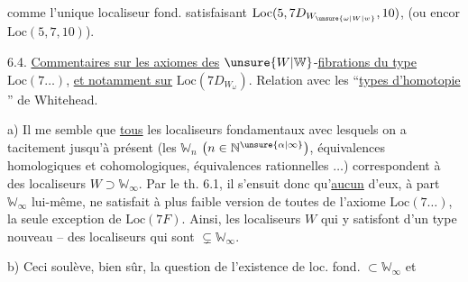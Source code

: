 comme l'unique localiseur fond. satisfaisant $\mathrm{Loc}(5,7D_{W_{\unsure{\omega|W|w}}},10)$, (ou encor $\mathrm{Loc}(5,7,10)$).

6.4. \uline{Commentaires sur les axiomes des} $\unsure{W|\mathbb W}$-\uline{fibrations du type} $\mathrm{Loc}(7\ldots)$, \uline{et notamment sur} $\mathrm{Loc}(7D_{W_\omega})$. Relation  avec les ``\uline{types d'homotopie }'' de Whitehead.

a) Il me semble que \uline{tous} les localiseurs fondamentaux avec lesquels on a  tacitement jusqu'à présent (les $\mathbb W_n$ $\bigl(n\in\mathbb N^{\unsure{\alpha|\infty}}\bigr)$, équivalences homologiques et cohomologiques, équivalences rationnelles $\ldots$) correspondent à des localiseurs $W\supset\mathbb W_\infty$. Par le th. 6.1, il s'ensuit donc qu'\uline{aucun} d'eux, à part $\mathbb W_\infty$ lui-même, ne satisfait à  plus faible version  de toutes de l'axiome $\mathrm{Loc}(7\ldots)$,   la seule  exception de $\mathrm{Loc}(7F)$. Ainsi, les localiseurs $W$ qui y satisfont     d'un type  nouveau -- des localiseurs qui sont $\subsetneq\mathbb W_\infty$.

b) Ceci soulève, bien sûr, la question de l'existence de loc. fond. $\subset\mathbb W_\infty$ et
